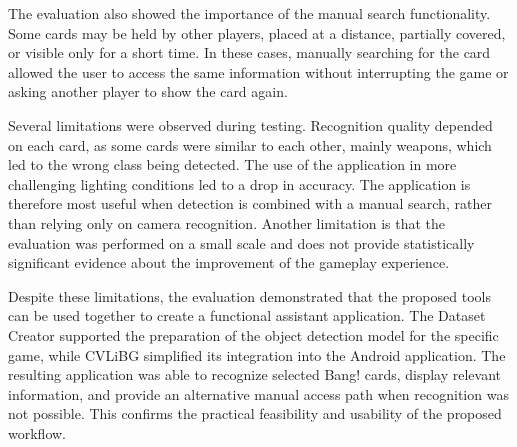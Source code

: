 The evaluation also showed the importance of the manual search functionality. Some cards may be held by other players, placed at a distance, partially covered, or visible only for a short time. In these cases, manually searching for the card allowed the user to access the same information without interrupting the game or asking another player to show the card again.

Several limitations were observed during testing. Recognition quality depended on each card, as some cards were similar to each other, mainly weapons, which led to the wrong class being detected. The use of the application in more challenging lighting conditions led to a drop in accuracy. The application is therefore most useful when detection is combined with a manual search, rather than relying only on camera recognition. Another limitation is that the evaluation was performed on a small scale and does not provide statistically significant evidence about the improvement of the gameplay experience.

Despite these limitations, the evaluation demonstrated that the proposed tools can be used together to create a functional assistant application. The Dataset Creator supported the preparation of the object detection model for the specific game, while CVLiBG simplified its integration into the Android application. The resulting application was able to recognize selected Bang! cards, display relevant information, and provide an alternative manual access path when recognition was not possible. This confirms the practical feasibility and usability of the proposed workflow.